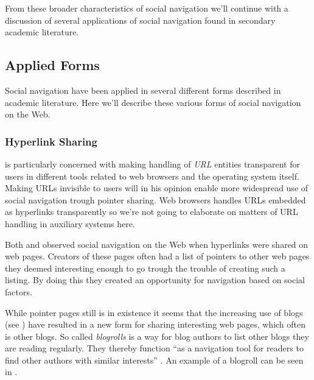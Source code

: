 
From these broader characteristics of social navigation we'll continue
with a discussion of several applications of social navigation found in
secondary academic literature.

\subsection{Applied Forms}

Social navigation have been applied in several different forms described in
academic literature. Here we'll describe these various forms of social
navigation on the Web.

\subsubsection{Hyperlink Sharing}

\citet{dieberger97} is particularly concerned with making handling of
\emph{URL}%
entities transparent for users in different tools related to web browsers and
the operating system itself. Making URLs invisible to users will in his
opinion enable more widespread use of social navigation trough pointer
sharing. Web browsers handles URLs embedded as hyperlinks
transparently so we're not going to elaborate on matters of URL handling in
auxiliary systems here.

Both \cite{dourish94} and \cite{dieberger97} observed social navigation on the
Web when hyperlinks were shared on web pages. Creators of these pages often
had a list of pointers to other web pages they deemed interesting enough to go
trough the trouble of creating such a listing. By doing this they created
an opportunity for navigation based on social factors.

While pointer pages still is in existence it seems that the increasing
use of blogs (see )
have resulted in a new form for sharing interesting web pages,
which often is other blogs. So called \emph{blogrolls} is a way for blog
authors to list other blogs they are reading regularly. They thereby function
``as a navigation tool for readers to find other authors with similar
interests'' \citep[p.~3]{marlow07}. An example of a blogroll can be seen in
.

